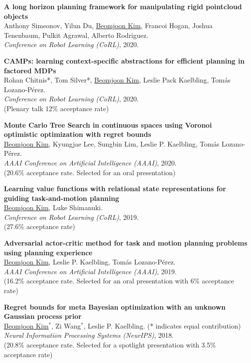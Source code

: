 \documentclass[line,margin,letterpaper]{res}
\begin{document}
\begin{resume}
\textbf{A long horizon planning framework for manipulating rigid pointcloud objects}\\
Anthony Simeonov, Yilun Du, \underline{Beomjoon Kim}, Francoi Hogan, Joshua Tenenbaum, Pulkit Agrawal, Alberto Rodriguez.\\
{\sl Conference on Robot Learning (CoRL)}, 2020.

\textbf{CAMPs: learning context-specific abstractions for efficient planning in factored MDPs}\\
Rohan Chitnis*, Tom Silver*, \underline{Beomjoon Kim}, Leslie Pack Kaelbling, Tom\'as Lozano-P\'erez.\\
{\sl Conference on Robot Learning (CoRL)}, 2020.\\
{\small (Plenary talk 12\% acceptance rate)}

\textbf{Monte Carlo Tree Search in continuous spaces using Voronoi optimistic optimization with regret bounds}\\
\underline{Beomjoon Kim}, Kyungjae Lee, Sungbin Lim, Leslie P. Kaelbling, Tom\'as Lozano-P\'erez.\\
{\sl AAAI Conference on Artificial Intelligence (AAAI)}, 2020. \\
{\small (20.6\% acceptance rate. Selected for an oral presentation)}

\textbf{Learning value functions with relational state representations for guiding task-and-motion planning}\\
\underline{Beomjoon Kim}, Luke Shimanuki.\\
{\sl Conference on Robot Learning (CoRL)}, 2019. \\
{\small (27.6\% acceptance rate)}

\textbf{Adversarial actor-critic method for task and motion planning problems using planning experience}\\
\underline{Beomjoon Kim}, Leslie P. Kaelbling, Tom\'as Lozano-P\'erez.\\
{\sl AAAI Conference on Artificial Intelligence (AAAI)}, 2019. \\
{\small (16.2\% acceptance rate. Selected for an oral presentation with 6\% acceptance rate)}

\textbf{Regret bounds for meta Bayesian optimization with an unknown Gaussian process prior}\\
\underline{Beomjoon Kim}$^*$, Zi Wang$^*$,  Leslie P. Kaelbling. {\small(* indicates equal contribution)}\\
{\sl Neural Information Processing Systems (NeurIPS)}, 2018.\\
{\small (20.8\% acceptance rate. Selected for a spotlight presentation with 3.5\% acceptance rate)}


\end{resume}
\end{document}
